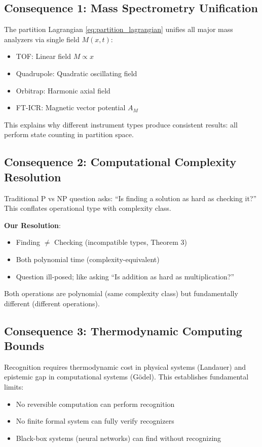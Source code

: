 \documentclass[twocolumn,aps,prl,superscriptaddress,floatfix]{revtex4-2}
\begin{document}
\subsection{Consequence 1: Mass Spectrometry Unification}

The partition Lagrangian \eqref{eq:partition_lagrangian} unifies all major mass analyzers via single field $M(x,t)$:
\begin{itemize}
\item TOF: Linear field $M \propto x$
\item Quadrupole: Quadratic oscillating field
\item Orbitrap: Harmonic axial field
\item FT-ICR: Magnetic vector potential $A_M$
\end{itemize}

This explains why different instrument types produce consistent results: all perform state counting in partition space.

\subsection{Consequence 2: Computational Complexity Resolution}

Traditional P vs NP question asks: ``Is finding a solution as hard as checking it?'' This conflates operational type with complexity class.

\textbf{Our Resolution}:
\begin{itemize}
\item Finding $\neq$ Checking (incompatible types, Theorem 3)
\item Both polynomial time (complexity-equivalent)
\item Question ill-posed; like asking ``Is addition as hard as multiplication?''
\end{itemize}

Both operations are polynomial (same complexity class) but fundamentally different (different operations).

\subsection{Consequence 3: Thermodynamic Computing Bounds}

Recognition requires thermodynamic cost in physical systems (Landauer) and epistemic gap in computational systems (G\"odel). This establishes fundamental limits:
\begin{itemize}
\item No reversible computation can perform recognition
\item No finite formal system can fully verify recognizers
\item Black-box systems (neural networks) can find without recognizing
\end{itemize}
\end{document}
